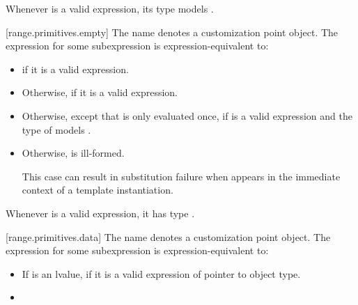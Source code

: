 \begin{addedblock}
\pnum
\begin{note}
Whenever  is a valid expression, its
type models .
\end{note}

[range.primitives.empty]{}
\pnum
The name  denotes a customization point
object. The expression
 for some subexpression  is
expression-equivalent to:

\begin{itemize}
\item
   if it is a valid expression.

\item
  Otherwise,  if it is a valid expression.

\item
  Otherwise, 
  except that  is only evaluated once, if 
   is a valid expression and the type of
   models .

\item
  Otherwise,  is ill-formed.
  {\color{newclr}
  \begin{note}
  This case can result in substitution failure when 
  appears in the immediate context of a template instantiation.
  \end{note}
  } %
\end{itemize}

\pnum
\begin{note}
Whenever  is a valid expression,
it has type .
\end{note}

[range.primitives.data]{}
\pnum
The name  denotes a customization point
object. The expression
 for some subexpression  is
expression-equivalent to:

\begin{itemize}
\item
  If  is an lvalue, 
  if it is a valid expression of pointer to object type.

\item


\end{itemize}
\end{addedblock}
